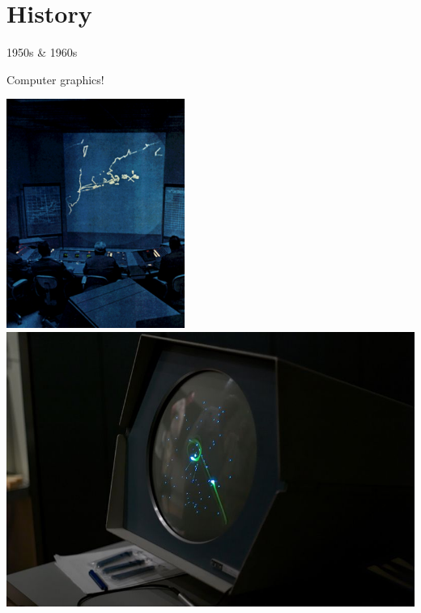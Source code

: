 \documentclass{lug}
\begin{document}
\section{History}

\begin{frame}{1950s \& 1960s}
    \noindent
    \begin{minipage}{.65\textwidth}
        Computer graphics!
    \end{minipage}%
    \begin{minipage}{.35\textwidth}
        \includegraphics[width=\textwidth]{graphics/sage_control} \\
        \includegraphics[width=\textwidth]{graphics/spacewar}
    \end{minipage}
\end{frame}
\end{document}
